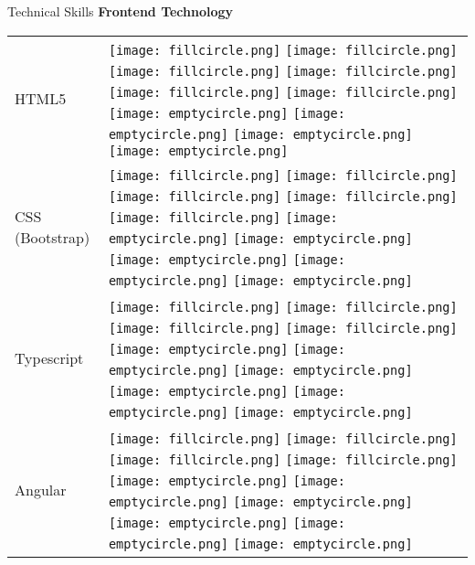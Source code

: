 \documentclass{resume}
\begin{document}
\begin{rSection}{Technical Skills}
\newpage
{\bf Frontend Technology}
\begin{table}[h!]
  \begin{tabular}{p{10cm}p{6cm}}
 HTML5 & 
 \texttt{[image: fillcircle.png]} 
 \texttt{[image: fillcircle.png]} 
 \texttt{[image: fillcircle.png]}
 \texttt{[image: fillcircle.png]} 
 \texttt{[image: fillcircle.png]}
 \texttt{[image: fillcircle.png]} 
 \texttt{[image: emptycircle.png]}
 \texttt{[image: emptycircle.png]} 
 \texttt{[image: emptycircle.png]} 
 \texttt{[image: emptycircle.png]} \\
 CSS (Bootstrap) & 
 \texttt{[image: fillcircle.png]} 
 \texttt{[image: fillcircle.png]} 
 \texttt{[image: fillcircle.png]}
 \texttt{[image: fillcircle.png]} 
 \texttt{[image: fillcircle.png]}
 \texttt{[image: emptycircle.png]} 
 \texttt{[image: emptycircle.png]}
 \texttt{[image: emptycircle.png]} 
 \texttt{[image: emptycircle.png]} 
 \texttt{[image: emptycircle.png]} \\
 Typescript & 
 \texttt{[image: fillcircle.png]} 
 \texttt{[image: fillcircle.png]} 
 \texttt{[image: fillcircle.png]}
 \texttt{[image: fillcircle.png]} 
 \texttt{[image: emptycircle.png]}
 \texttt{[image: emptycircle.png]} 
 \texttt{[image: emptycircle.png]}
 \texttt{[image: emptycircle.png]} 
 \texttt{[image: emptycircle.png]} 
 \texttt{[image: emptycircle.png]} \\
 Angular & 
 \texttt{[image: fillcircle.png]} 
 \texttt{[image: fillcircle.png]} 
 \texttt{[image: fillcircle.png]}
 \texttt{[image: fillcircle.png]} 
 \texttt{[image: emptycircle.png]}
 \texttt{[image: emptycircle.png]} 
 \texttt{[image: emptycircle.png]}
 \texttt{[image: emptycircle.png]} 
 \texttt{[image: emptycircle.png]} 
 \texttt{[image: emptycircle.png]} \\
 \end{tabular}
\end{table}


\end{rSection}
\end{document}
